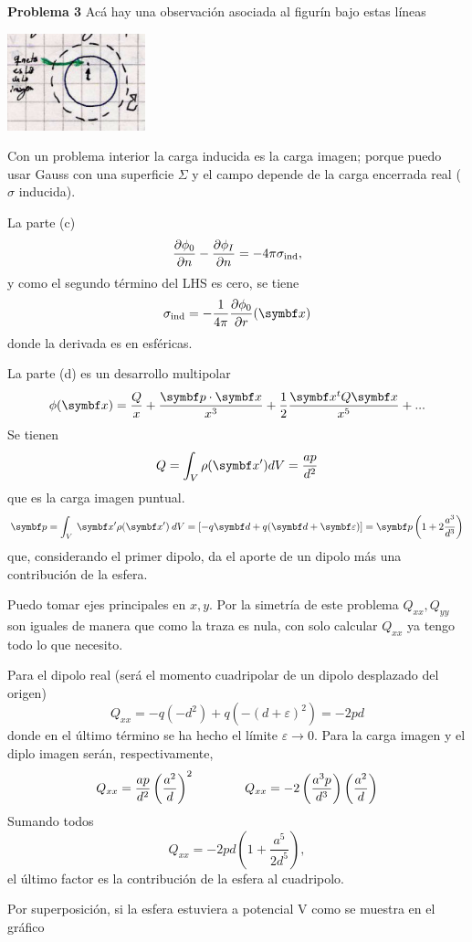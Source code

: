 \documentclass[10pt,oneside]{CBFT_book}
\begin{document}
\begin{ejemplo}{\bf Problema 3}
Acá hay una observación asociada al figurín bajo estas líneas

\includegraphics[width=0.3\textwidth]{images/fig_ft1_problema3B.jpg}

Con un problema interior la carga inducida es la carga imagen; porque puedo usar Gauss con una
superficie $\Sigma$ y el campo depende de la carga encerrada real ($\sigma$ inducida).

La parte (c) 
\[
	\frac{\partial^{\hspace{-0.05em}} {\phi_0}}{\partial {n}^{\hspace{-0.05em}}} - \frac{\partial^{\hspace{-0.05em}} {\phi_I}}{\partial {n}^{\hspace{-0.05em}}} = - 4 \pi \sigma_\text{ind},
\]
y como el segundo término del LHS es cero, se tiene
\[
	\sigma_\text{ind} = - \frac{1}{ 4 \pi } \dpar{\phi_0}{r}(\vbx)
\]
donde la derivada es en esféricas.

La parte (d) es un desarrollo multipolar
\[
	\phi(\vbx) = \frac{Q}{x} + \frac{ \pe{p}{x} }{x^3} + \frac{1}{2} \frac{ \vb{x}^t Q \vbx }{x^5} + ...
\]
Se tienen
\[
	Q = \int_V \rho(\vbx') dV = \frac{ a p }{ d^2 }
\]
que es la carga imagen puntual.
\[
	\vb{p} = \int_V \: \vbx'\rho(\vbx') \: dV = [ -q \vb{d} + q ( \vb{d} + \vb{\varepsilon} ) ] =
	\vb{p} \left( 1  + 2\frac{a^3}{d^3} \right)
\]
que, considerando el primer dipolo, da el aporte de un dipolo más una contribución de la esfera.


Puedo tomar ejes principales en $x,y$. Por la simetría de este problema $Q_{xx}, Q_{yy}$ son iguales
de manera que como la traza es nula, con solo calcular $Q_{xx}$ ya tengo todo lo que necesito.

Para el dipolo real (será el momento cuadripolar de un dipolo desplazado del origen)
\[
	Q_{xx} = - q (-d^2 ) + q( -( d + \varepsilon )^2 ) = - 2 p d
\]
donde en el último término se ha hecho el límite $\varepsilon \to 0$.
Para la carga imagen y el diplo imagen serán, respectivamente,
\[
	Q_{xx} = \frac{ap}{d^2} \left( \frac{ a^2 }{ d } \right)^2 \qquad \qquad 
	Q_{xx} = - 2 \left( \frac{ a^3 p }{ d^3 } \right) \left( \frac{ a^2 }{ d } \right)
\]
Sumando todos
\[
	Q_{xx} = - 2 p d \left( 1 + \frac{a^5}{2 d^5} \right),
\]
el último factor es la contribución de la esfera al cuadripolo.

Por superposición, si la esfera estuviera a potencial V como se muestra en el gráfico 


\end{ejemplo}
\end{document}
